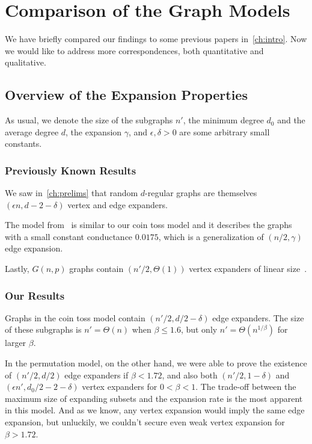\chapter{Comparison of the Graph Models}
\label{ch:comparison}

We have briefly compared our findings to some previous papers in~\autoref{ch:intro}.
Now we would like to address more correspondences, both quantitative and qualitative.

\section{Overview of the Expansion Properties}

As usual, we denote the size of the subgraphs $n'$,
the minimum degree $d_0$ and the average degree $d$,
the expansion $\gamma$, and $\epsilon,\delta>0$ are some arbitrary small constants.

\subsection{Previously Known Results}

We saw in~\autoref{ch:prelims} that random $d$-regular graphs are
themselves $(\epsilon n,d-2-\delta)$ vertex and edge expanders.

The model from~\cite{gms03} is similar to our coin toss model
and it describes the graphs with a small constant conductance $0.0175$,
which is a generalization of $(n/2,\gamma)$ edge expansion.

Lastly, $G(n,p)$ graphs contain $(n'/2,\Theta(1))$ vertex expanders of linear size~\cite{kri17}.

\subsection{Our Results}

Graphs in the coin toss model contain $(n'/2,d/2-\delta)$ edge expanders.
The size of these subgraphs is $n'=\Theta(n)$ when $\beta\leq 1.6$,
but only $n'=\Theta\left(n^{1/\beta}\right)$ for larger $\beta$.

In the permutation model, on the other hand, we were able to prove
the existence of $(n'/2,d/2)$ edge expanders if $\beta<1.72$,
and also both $(n'/2,1-\delta)$ and $(\epsilon n',d_0/2-2-\delta)$
vertex expanders for $0<\beta<1$.
The trade-off between the maximum size of expanding subsets
and the expansion rate is the most apparent in this model.
And as we know, any vertex expansion would imply the same edge expansion,
but unluckily, we couldn't secure even weak vertex expansion for $\beta>1.72$.

